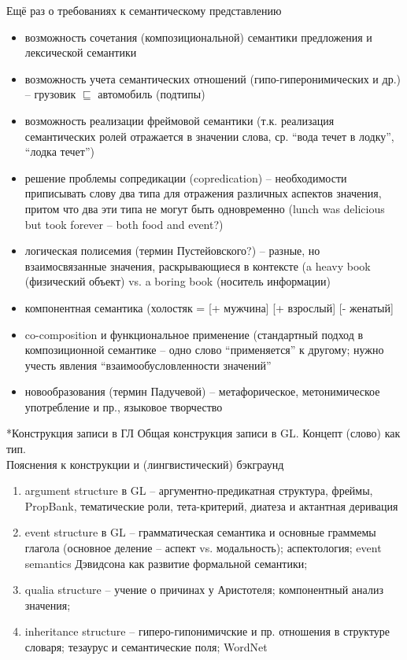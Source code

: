 \documentclass[10pt]{article}
\makeatletter
\renewcommand{\section}{\@startsection{section}{1}{5.5ex}{-3.5ex plus -1ex minus -.2ex}{2.3ex plus.2ex}{\raggedright\hyphenpenalty=10000\normalfont\bfseries}}
\theoremstyle{example-style}
\makeatother
\begin{document}
Ещё раз о требованиях к семантическому представлению
\begin{itemize}
	\item возможность сочетания (композициональной) семантики предложения и лексической семантики
	\item возможность учета семантических отношений (гипо-гиперонимических и др.) -- грузовик $\sqsubseteq$ автомобиль (подтипы)
	\item возможность реализации фреймовой семантики (т.к. реализация семантических ролей отражается в значении слова, 
 ср. ``вода течет в лодку'', ``лодка течет'')
	\item решение проблемы сопредикации (copredication) -- необходимости приписывать слову два типа для
 отражения различных аспектов значения, притом что два эти типа не могут быть одновременно
 (lunch was delicious but took forever -- both food and event?)
	\item логическая полисемия (термин Пустейовского?) -- разные, но взаимосвязанные значения, раскрывающиеся в контексте
 (a heavy book (физический объект) vs. a boring book (носитель информации)
	\item компонентная семантика (холостяк = [+ мужчина] [+ взрослый] [- женатый]
	\item co-composition и функциональное применение (стандартный подход в композиционной семантике -- одно слово ``применяется'' к другому; нужно учесть явления ``взаимообусловленности значений''
	\item новообразования (термин Падучевой) -- метафорическое, метонимическое употребление и пр., языковое творчество 
\end{itemize} 


\section*{Конструкция записи в ГЛ}
Общая конструкция записи в GL. Концепт (слово) как тип.\\

Пояснения к конструкции и (лингвистический) бэкграунд
\begin{enumerate}
    \item argument structure в GL -- аргументно-предикатная структура, фреймы, PropBank, тематические роли, тета-критерий, диатеза и актантная деривация
    \item event structure в GL -- грамматическая семантика и основные граммемы глагола (основное деление -- аспект vs. модальность); аспектология; event semantics Дэвидсона как развитие формальной семантики;
    \item qualia structure -- учение о причинах у Аристотеля; компонентный анализ значения; 
    \item inheritance structure -- гиперо-гипонимичские и пр. отношения в структуре словаря; тезаурус и семантические поля; WordNet
\end{enumerate}
\end{document}
